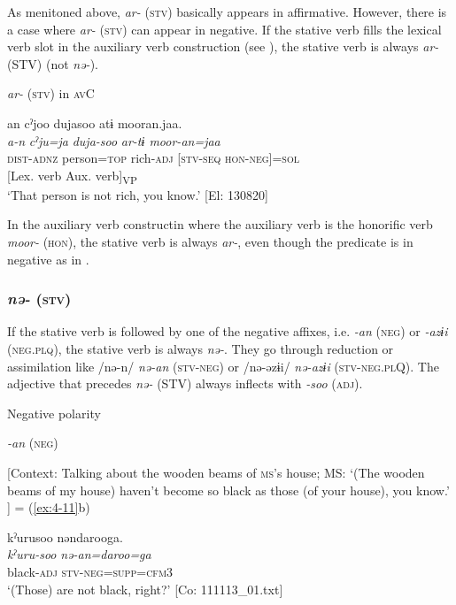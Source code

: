 As menitoned above, \textit{ar-} (\textsc{stv}) basically appears in affirmative. However, there is a case where \textit{ar-} (\textsc{stv}) can appear in negative. If the stative verb fills the lexical verb slot in the auxiliary verb construction (see ), the stative verb is always \textit{ar-} (STV) (not \textit{nə-}).

\ea\label{ex:8-48}
  \textit{ar-} (\textsc{stv}) in \textsc{av}C

  {\TM}
\glll  an  cˀjoo  dujasoo  atɨ  mooran.jaa.\\
\textit{a-n}  \textit{cˀju=ja}  \textit{duja-soo}  \textit{ar-tɨ  moor-an=jaa}\\
    \textsc{dist}-\textsc{adnz}  person=\textsc{top}  rich-\textsc{adj}  [\textsc{stv}-\textsc{seq}  \textsc{hon}-\textsc{neg}]=\textsc{sol}\\
          {}[Lex. verb  Aux. verb]\textsubscript{VP}\\
\glt ‘That person is not rich, you know.’ [El: 130820]
\z


In the auxiliary verb constructin where the auxiliary verb is the honorific verb \textit{moor-} (\textsc{hon}), the stative verb is always \textit{ar-}, even though the predicate is in negative as in .

\subsubsection{\textit{nə-} (\textsc{stv})}

If the stative verb is followed by one of the negative affixes, i.e. \textit{-an} (\textsc{neg}) or \textit{-azɨi} (\textsc{neg}.\textsc{plq}), the stative verb is always \textit{nə-}. They go through reduction or assimilation like /nə-n/ \textit{nə-an} (\textsc{stv}-\textsc{neg}) or /nə-əzɨi/ \textit{nə-azɨi} (\textsc{stv}-\textsc{neg}.\textsc{pl}Q). The adjective that precedes \textit{nə-} (STV) always inflects with \textit{-soo} (\textsc{adj}).

\ea\label{ex:8-49}
  Negative polarity

\ea
\textit{-an} (\textsc{neg})

    [Context: Talking about the wooden beams of \textsc{ms}’s house; MS: ‘(The wooden beams of my house) haven’t become so black as those (of your house), you know.’ ] = (\ref{ex:4-11}b)

{\TM}
\glll  kˀurusoo  nəndarooga.\\
\textit{kˀuru-soo}  \textit{nə-an=daroo=ga}\\
black-\textsc{adj}  \textsc{stv}-\textsc{neg}=\textsc{supp}=\textsc{cfm3}\\
\glt ‘(Those) are not black, right?’ [Co: 111113\_01.txt]


